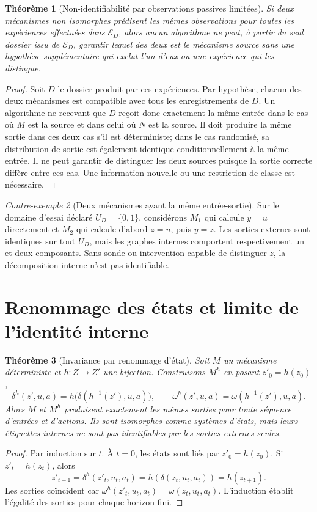 \documentclass[11pt,oneside]{book}
\newtheorem{theoreme}{Théorème}[chapter]
\theoremstyle{definition}
\theoremstyle{remark}
\newtheorem{contreexemple}[theoreme]{Contre-exemple}
\newcommand{\1}{\mathbf 1}
\begin{document}
\begin{theoreme}[Non-identifiabilité par observations passives limitées]
Si deux mécanismes non isomorphes prédisent les mêmes observations pour toutes les expériences effectuées dans $\mathcal E_D$, alors aucun algorithme ne peut, à partir du seul dossier issu de $\mathcal E_D$, garantir lequel des deux est le mécanisme source sans une hypothèse supplémentaire qui exclut l'un d'eux ou une expérience qui les distingue.
\end{theoreme}
\begin{proof}
Soit $D$ le dossier produit par ces expériences. Par hypothèse, chacun des deux mécanismes est compatible avec tous les enregistrements de $D$. Un algorithme ne recevant que $D$ reçoit donc exactement la même entrée dans le cas où $M$ est la source et dans celui où $N$ est la source. Il doit produire la même sortie dans ces deux cas s'il est déterministe; dans le cas randomisé, sa distribution de sortie est également identique conditionnellement à la même entrée. Il ne peut garantir de distinguer les deux sources puisque la sortie correcte diffère entre ces cas. Une information nouvelle ou une restriction de classe est nécessaire.\end{proof}

\begin{contreexemple}[Deux mécanismes ayant la même entrée-sortie]
Sur le domaine d'essai déclaré $U_D=\{0,1\}$, considérons $M_1$ qui calcule $y=u$ directement et $M_2$ qui calcule d'abord $z=u$, puis $y=z$. Les sorties externes sont identiques sur tout $U_D$, mais les graphes internes comportent respectivement un et deux composants. Sans sonde ou intervention capable de distinguer $z$, la décomposition interne n'est pas identifiable.
\end{contreexemple}

\section{Renommage des états et limite de l'identité interne}
\begin{theoreme}[Invariance par renommage d'état]
Soit $M$ un mécanisme déterministe et $h:Z\to Z'$ une bijection. Construisons $M^h$ en posant $z'_0=h(z_0)$,
\[
\delta^h(z',u,a)=h\bigl(\delta(h^{-1}(z'),u,a)\bigr),\qquad
\omega^h(z',u,a)=\omega(h^{-1}(z'),u,a).
\]
Alors $M$ et $M^h$ produisent exactement les mêmes sorties pour toute séquence d'entrées et d'actions. Ils sont isomorphes comme systèmes d'états, mais leurs étiquettes internes ne sont pas identifiables par les sorties externes seules.
\end{theoreme}
\begin{proof}
Par induction sur $t$. À $t=0$, les états sont liés par $z'_0=h(z_0)$. Si $z'_t=h(z_t)$, alors
\[
z'_{t+1}=\delta^h(z'_t,u_t,a_t)=h(\delta(z_t,u_t,a_t))=h(z_{t+1}).
\]
Les sorties coïncident car $\omega^h(z'_t,u_t,a_t)=\omega(z_t,u_t,a_t)$. L'induction établit l'égalité des sorties pour chaque horizon fini.\end{proof}
\end{document}
